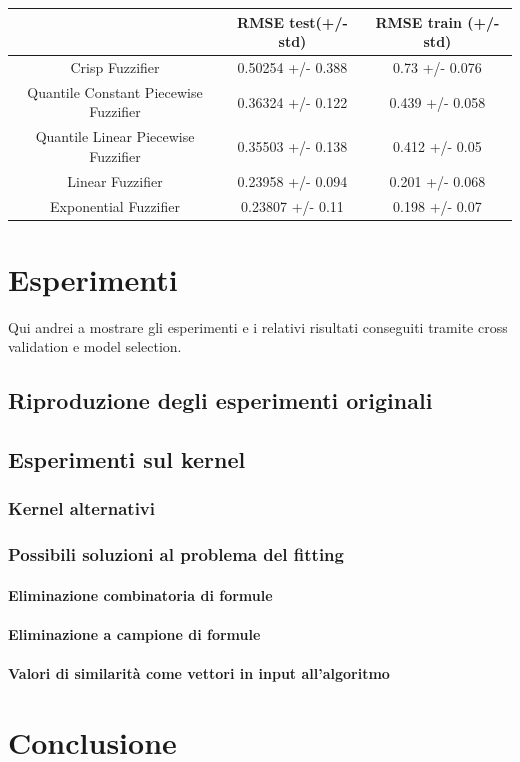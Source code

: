 \documentclass[12pt,a4paper]{report}
\begin{document}
\begin{table}[h!]
\small
\centering 	
	\begin{tabular}{|c|c|c|} 
	 \hline
	  & RMSE test(+/- std) & RMSE train (+/- std)\\ [0.5ex] 
	 \hline
	 Crisp Fuzzifier & 0.50254 +/- 0.388 & 0.73 +/- 0.076 \\ 
	 \hline
	 Quantile Constant Piecewise Fuzzifier & 0.36324 +/- 0.122 & 0.439 +/- 0.058\\
	 \hline
	 Quantile Linear Piecewise Fuzzifier & 0.35503 +/- 0.138	 & 0.412 +/- 0.05\\
	 \hline
	 Linear Fuzzifier & 0.23958 +/- 0.094 & 0.201 +/- 0.068\\
	 \hline
	 Exponential Fuzzifier & 0.23807 +/- 0.11 & 0.198 +/- 0.07\\ [1ex] 
	 \hline
	\end{tabular}
\end{table}


\chapter{Esperimenti}
Qui andrei a mostrare gli esperimenti e i relativi risultati conseguiti tramite cross validation e model selection.
\section{Riproduzione degli esperimenti originali}
\section{Esperimenti sul kernel}
\subsection{Kernel alternativi}
\subsection{Possibili soluzioni al problema del fitting}
\subsubsection{Eliminazione combinatoria di formule}
\subsubsection{Eliminazione a campione di formule}
\subsubsection{Valori di similarità come vettori in input all'algoritmo}

\chapter*{Conclusione}



\end{document}
